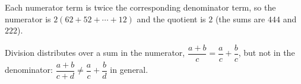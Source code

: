 Each numerator term is twice the corresponding denominator term, so the numerator is $2(62+52+\cdots+12)$ and the quotient is $\boxed{2}$ (the sums are $444$ and $222$).

Division distributes over a sum in the numerator, $\dfrac{a+b}c=\dfrac ac+\dfrac bc$, but not in the denominator: $\dfrac{a+b}{c+d}\ne\dfrac ac+\dfrac bd$ in general.
